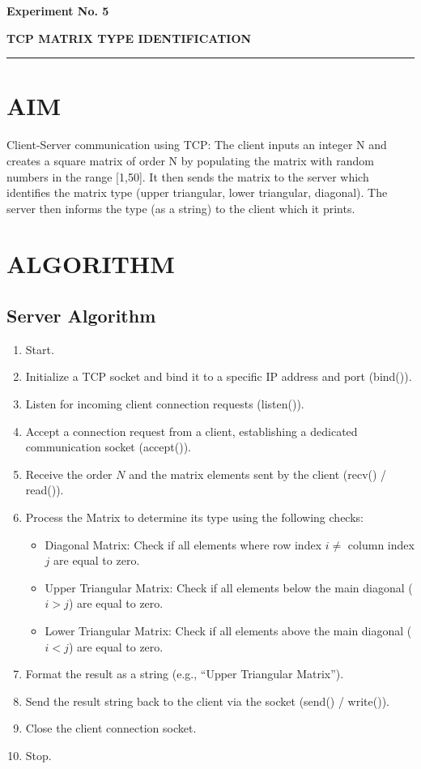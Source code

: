 \documentclass[12pt,a4paper]{article}
\newcommand{\experiment}[2]{
	\newpage
	
	\begin{center}
		\noindent
		\begin{minipage}{\textwidth}
			\centering
			{\textbf{\Large Experiment No. #1}}
			
			\vspace{1cm}
			
			\textbf{\Large #2}
		\end{minipage}
		
		\vspace{0.3cm}
		\noindent\rule{\textwidth}{0.6pt}
	\end{center}
}
\begin{document}
	
	
	
	
	
	
	\experiment{5}{TCP MATRIX TYPE IDENTIFICATION}
	
	\section*{AIM}
	
	Client-Server communication using TCP: The client inputs an integer N and creates a
	square matrix of order N by populating the matrix with random numbers in the range
	[1,50]. It then sends the matrix to the server which identifies the matrix type (upper
	triangular, lower triangular, diagonal). The server then informs the type (as a string) to the
	client which it prints.
	\vspace{-0.3cm}
	\section*{ALGORITHM}

	\subsection*{Server Algorithm}
	\begin{enumerate}
		\item Start.
		\item Initialize a TCP socket and bind it to a specific IP address and port (bind()).
		\item Listen for incoming client connection requests (listen()).
		\item Accept a connection request from a client, establishing a dedicated communication socket (accept()).
		\item Receive the order $N$ and the matrix elements sent by the client (recv() / read()).
		\item Process the Matrix to determine its type using the following checks:
		\begin{itemize}
			\item Diagonal Matrix: Check if all elements where row index $i \neq$ column index $j$ are equal to zero.
			\item Upper Triangular Matrix: Check if all elements below the main diagonal ($i > j$) are equal to zero.
			\item Lower Triangular Matrix: Check if all elements above the main diagonal ($i < j$) are equal to zero.
		\end{itemize}
		\item Format the result as a string (e.g., ``Upper Triangular Matrix'').
		\item Send the result string back to the client via the socket (send() / write()).
		\item Close the client connection socket.
		\item Stop.
	\end{enumerate}
\end{document}
